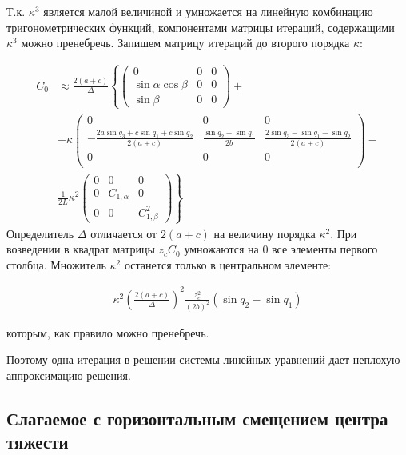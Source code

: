 Т.к. $\kappa^3$ является малой величиной и умножается на линейную комбинацию тригонометрических функций, компонентами матрицы итераций, содержащими $\kappa^3$ можно пренебречь. Запишем матрицу итераций до второго порядка $\kappa$:

\begin{equation}
\begin{aligned}
	C_0 & \approx \frac{2\left(a+c\right)}{\Delta}\left\lbrace \begin{pmatrix}
	0 & 0 & 0 \\ \sin{\alpha}\cos{\beta} & 0 & 0 \\ \sin{\beta} & 0 & 0
	\end{pmatrix} + \right.\\
	&\left. + \kappa\begin{pmatrix}
	0 & 0 & 0 \\
	-\frac{2a\sin{q_3}+c\sin{q_1}+c\sin{q_2}}{2\left(a+c\right)} & \frac{\sin{q_2}-\sin{q_1}}{2b} & \frac{2\sin{q_3} - \sin{q_1} - \sin{q_2}}{2\left(a+c\right)}\\
	0 & 0 & 0 \\
	\end{pmatrix} - \right.\\
	& \left.\frac{1}{2L}\kappa^2\begin{pmatrix}
	0 & 0 & 0 \\
	0 & C_{1,\alpha} & 0 \\
	0 & 0 & C^2_{1,\beta}
	\end{pmatrix}\right\rbrace
\end{aligned}
\end{equation}
 Определитель $\Delta$ отличается от $2\left(a+c\right)$ на величину порядка $\kappa^2$. При возведении в квадрат матрицы $z_cC_0$ умножаются на 0 все элементы первого столбца. Множитель $\kappa^2$ останется только в центральном элементе:

\begin{equation}
\begin{aligned}
	\kappa^2\left(\frac{2\left(a+c\right)}{\Delta}\right)^2 \frac{z^2_c}{\left(2b\right)^2}\left(\sin{q_2} - \sin{q_1}\right)
\end{aligned}
\end{equation}

которым, как правило можно пренебречь.

Поэтому одна итерация в решении системы линейных уравнений дает неплохую аппроксимацию решения.

\subsection{Слагаемое с горизонтальным смещением центра тяжести}

